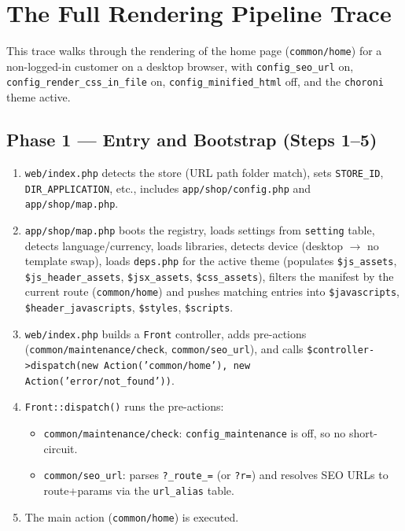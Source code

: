 \documentclass[11pt,a4paper]{article}
\begin{document}
\section{The Full Rendering Pipeline Trace}\label{sec:trace}

This trace walks through the rendering of the home page
(\texttt{common/home}) for a non-logged-in customer on a desktop
browser, with \texttt{config\_seo\_url} on,
\texttt{config\_render\_css\_in\_file} on,
\texttt{config\_minified\_html} off, and the \texttt{choroni}
theme active.

\subsection{Phase 1 --- Entry and Bootstrap (Steps 1--5)}

\begin{enumerate}[leftmargin=1.6em,itemsep=2pt]
  \item \texttt{web/index.php} detects the store (URL path folder
        match), sets \texttt{STORE\_ID}, \texttt{DIR\_APPLICATION},
        etc., includes \texttt{app/shop/config.php} and
        \texttt{app/shop/map.php}.
  \item \texttt{app/shop/map.php} boots the registry, loads
        settings from \texttt{setting} table, detects
        language/currency, loads libraries, detects device
        (desktop $\to$ no template swap), loads
        \texttt{deps.php} for the active theme (populates
        \texttt{\$js\_assets}, \texttt{\$js\_header\_assets},
        \texttt{\$jsx\_assets}, \texttt{\$css\_assets}), filters
        the manifest by the current route (\texttt{common/home})
        and pushes matching entries into \texttt{\$javascripts},
        \texttt{\$header\_javascripts}, \texttt{\$styles},
        \texttt{\$scripts}.
  \item \texttt{web/index.php} builds a \texttt{Front} controller,
        adds pre-actions (\texttt{common/maintenance/check},
        \texttt{common/seo\_url}), and calls
        \texttt{\$controller->dispatch(new Action('common/home'),
        new Action('error/not\_found'))}.
  \item \texttt{Front::dispatch()} runs the pre-actions:
        \begin{itemize}[itemsep=2pt]
          \item \texttt{common/maintenance/check}: \texttt{config\_maintenance}
                is off, so no short-circuit.
          \item \texttt{common/seo\_url}: parses
                \texttt{?\_route\_=} (or \texttt{?r=}) and resolves
                SEO URLs to route+params via the \texttt{url\_alias}
                table.
        \end{itemize}
  \item The main action (\texttt{common/home}) is executed.
\end{enumerate}
\end{document}
